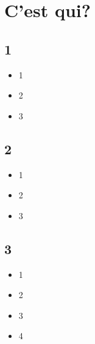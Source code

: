 \section{C'est qui?}
\subsection{1}
\begin{itemize}
    \item 1
    \item 2
    \item 3
\end{itemize}

\subsection{2}
\begin{itemize}
    \item 1
    \item 2
    \item 3
\end{itemize}

\subsection{3}
\begin{itemize}
    \item 1
    \item 2
    \item 3
    \item 4
\end{itemize}